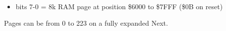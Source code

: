 \begin{itemize}
\item bits 7-0 = 8k RAM page at position \$6000 to \$7FFF (\$0B on
  reset)
\end{itemize}
Pages can be from 0 to 223 on a fully expanded Next.

